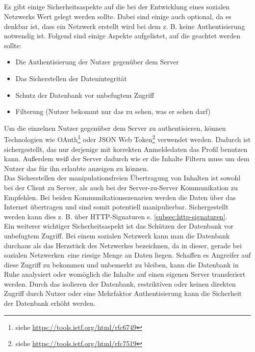 	\subsection{
	}
	Es gibt einige Sicherheitsaspekte auf die bei der Entwicklung eines sozialen Netzwerks Wert gelegt werden sollte. Dabei sind einige auch optional, da es denkbar ist, dass ein Netzwerk erstellt wird bei dem z. B. keine Authentisierung notwendig ist. Folgend sind einige Aspekte aufgelistet, auf die geachtet werden sollte:
	\begin{itemize}
		\item Die Authentisierung der Nutzer gegenüber dem Server
		\item Das Sicherstellen der Datenintegrität
		\item Schutz der Datenbank vor unbefugtem Zugriff
		\item Filterung (Nutzer bekommt nur das zu sehen, was er sehen darf)
	\end{itemize}
	Um die einzelnen Nutzer gegenüber dem Server zu authentisieren, können Technologien wie OAuth\footnote{siehe \url{https://tools.ietf.org/html/rfc6749}} oder JSON Web Token\footnote{siehe \url{https://tools.ietf.org/html/rfc7519}} verwendet werden. Dadurch ist sichergestellt, das nur derjenige mit korrekten Anmeldedaten das Profil benutzen kann. Außerdem weiß der Server dadurch wie er die Inhalte Filtern muss um dem Nutzer das für ihn erlaubte anzeigen zu können.\\
	
	Das Sicherstellen der manipulationsfreien Übertragung von Inhalten ist sowohl bei der Client zu Server, als auch bei der Server-zu-Server Kommunikation zu Empfehlen. Bei beiden Kommunikationsszenarien werden die Daten über das Internet übertragen und sind somit potentiell manipulierbar. Sichergestellt werden kann dies z. B. über HTTP-Signaturen s. \ref{subsec:http-signaturen}.\\
	
	Ein weiterer wichtiger Sicherheitsaspekt ist das Schützen der Datenbank vor unbefugtem Zugriff. Bei einem sozialen Netzwerk kann man die Datenbank durchaus als das Herzstück des Netzwerkes bezeichnen, da in dieser, gerade bei \glqq sozialen Netzwerken\grqq~eine riesige Menge an Daten liegen. Schaffen es Angreifer auf diese Zugriff zu bekommen und unbemerkt zu bleiben, kann die Datenbank in Ruhe analysiert oder womöglich die Inhalte auf einen eigenen Server transferiert werden. Durch das isolieren der Datenbank, restriktiven oder keinen direkten Zugriff durch Nutzer oder eine Mehrfaktor Authentisierung kann die Sicherheit der Datenbank erhöht werden.
